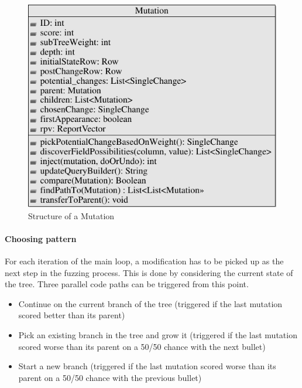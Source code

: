 \documentclass{article}
\begin{document}
\begin{empfile}
\clearpage

\begin{figure} [h!]
\centering
\includegraphics[width=\textwidth]{MutationClassDiagram-1.pdf}
\caption{Structure of a Mutation}
\end{figure}

\bigskip
  				
				\paragraph{Choosing pattern}
For each iteration of the main loop, a modification has to be picked up as the next step in the fuzzing process. This is done by considering the current state of the tree.
Three parallel code paths can be triggered from this point.
				\begin{itemize}
				\item{Continue on the current branch of the tree (triggered if the last mutation scored better than its parent)}
				\item{Pick an existing branch in the tree and grow it (triggered if the last mutation scored worse than its parent on a 50/50 chance with the next bullet)}
				\item{Start a new branch (triggered if the last mutation scored worse than its parent on a 50/50 chance with the previous bullet)}
				

\end{itemize}
\end{empfile}
\end{document}
